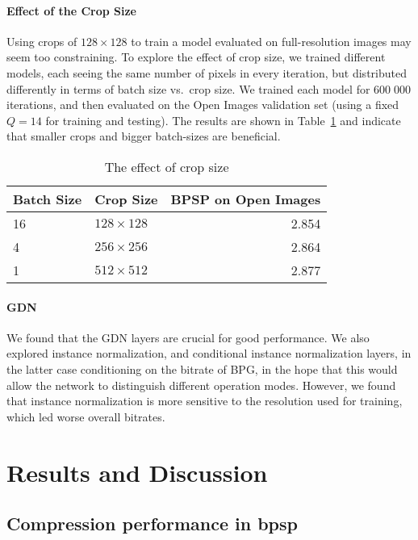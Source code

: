 \paragraph{Effect of the Crop Size}
Using crops of $128{\times}128$ to train a model evaluated on full-resolution images may seem too constraining. To explore the effect of crop size,
we trained different models, each seeing the same number of pixels in every iteration, but distributed differently in terms of batch size vs.\ crop size. We trained each model for $600\;000$ iterations, and then evaluated on the Open Images validation set (using a fixed $Q=14$ for training and testing). The results are shown in Table~\ref{rc:table:crop_size} and indicate that smaller crops and bigger batch-sizes are beneficial.  

\begin{table}
    \begin{center}
    \begin{tabular}{llr}
        \toprule
        Batch Size & Crop Size & BPSP on Open Images \\
        \midrule
        16 & $128{\times}128$ & 2.854 \\
        4 & $256{\times}256$ & 2.864 \\
        1 & $512{\times}512$ & 2.877 \\
        \bottomrule
    \end{tabular}
        \caption{\label{rc:table:crop_size}The effect of crop size}
    \end{center}
\end{table}


\paragraph{GDN}
We found that the GDN layers are crucial for good performance. We also explored instance normalization, and conditional instance normalization layers, in the latter case conditioning on the bitrate of BPG, in the hope that this would allow the network to distinguish different operation modes. 
However, we found that instance normalization 
is more sensitive to the resolution used for training, which led worse overall bitrates.


\section{Results and Discussion}

\subsection{Compression performance in bpsp}

